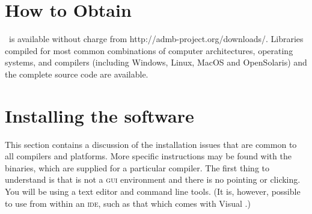 \documentclass{admbmanual}
\begin{document}
\section{How to Obtain \ADM}

\ADM\ is available without charge from
http://admb-project.org/downloads/.
Libraries compiled 
for most common combinations of computer 
architectures, operating systems, and compilers (including Windows,
Linux, MacOS and OpenSolaris) and the complete source code are
available.


\section{Installing the software}

This section contains a discussion of the installation issues
that are common to all compilers and platforms. More specific
instructions may be found with the binaries, which are supplied for 
a particular compiler.
The first thing to understand is that \ADMS is not a \textsc{gui}
environment and there is no pointing or clicking. You will be
using a text editor and command line tools. (It is, however,
possible to use \ADMS from within an \textsc{ide}, such as that which comes with
Visual \cplus.)
\end{document}
